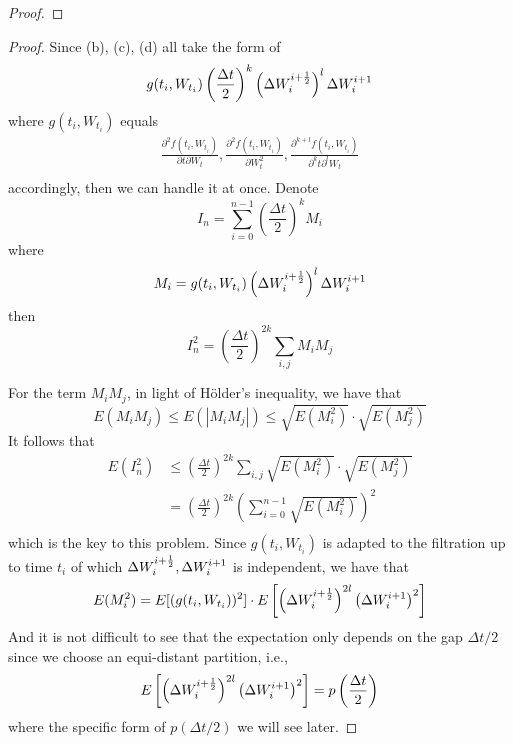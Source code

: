 \documentclass{homework}
\begin{document}
\begin{subproblem}[(\alph*)]
\begin{proof}
        \end{proof}

        \item
        \begin{proof}
        Since (b), (c), (d) all take the form of
        \newcommand{\gt}[1]{g(#1,W_{#1})}
        \newcommand{\increment}{\left(\frac{\Delta t}{2}\right)}
        \[\gt{t_i}\increment^k\left(\dws i\right)^l\dw i\]
        where $\gt{t_i}$ equals
        \[\begin{aligned}
            \frac{\partial^2f(t_i,W_{t_i})}{\partial t\partial W_t},
            \frac{\partial^2f(t_i,W_{t_i})}{\partial W_t^2},
            \frac{\partial^{k+l}f(t_i,W_{t_i})}{\partial^kt\partial^l W_t}\\
        \end{aligned}\]
        accordingly,
        then we can handle it at once.
        Denote
        \[I_n=\sum_{i=0}^{n-1}
        \increment^k M_i\]
        where
        \[M_i=
        \gt{t_i}\left(\dws i\right)^l\dw i\]
        then
        \[
            I_n^2=\increment^{2k}
            \sum_{i,j}M_iM_j
        \]

        For the term $M_iM_j$, in light of H\"older's inequality,
        we have that
        \[E(M_iM_j)\leq E(|M_iM_j|)\leq \sqrt{E(M_i^2)}\cdot\sqrt{E(M_j^2)}\]
        It follows that
        \begin{equation}
            \label{eq:EIn2<=}
            \begin{aligned}
            E(I_n^2)&\leq
            \increment^{2k}
            \sum_{i,j}\sqrt{E(M_i^2)}\cdot\sqrt{E(M_j^2)}\\
        &=\increment^{2k}\left(\sum_{i=0}^{n-1}\sqrt{E(M_i^2)}\right)^2\\
        \end{aligned}\end{equation}
        which is the key to this problem.
        Since $\gt{t_i}$ is adapted to the filtration up to time $t_i$
        of which $\Delta W_{i}^{i+\frac{1}{2}},\Delta W_{i}^{i+1}$ is independent, we have that
        \begin{equation}
            \label{eq:EMi2}
            E(M_i^2)=E[(\gt{t_i})^2]\cdot
            E\left[\left(\dws i\right)^{2l}\left(\dw i\right)^2\right]
        \end{equation}
        And it is not difficult to see that
        the expectation only depends
        on the gap $\Delta t/2$ since we choose an equi-distant partition,
        i.e.,
        \[
            E\left[
            \left(\Delta W_{i}^{i+\frac{1}{2}}\right)^{2l}
            \left(\Delta W_{i}^{i+1}\right)^2
            \right]
            =p\left(\frac{\Delta t}{2}\right)
        \]
        where the specific form of $p(\Delta t/2)$
        we will see later.


\end{proof}
\end{subproblem}
\end{document}
